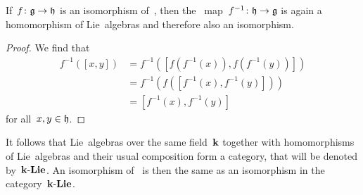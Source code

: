 \begin{lemma}
 If~$f \colon \mathfrak{g} \to \mathfrak{h}$ is an isomorphism of~{\liealgebras{$\kf$}}, then the~{\linear{$\kf$}} map~$f^{-1} \colon \mathfrak{h} \to \mathfrak{g}$ is again a homomorphism of Lie~algebras and therefore also an isomorphism.
\end{lemma}


\begin{proof}
 We find that
 \begin{align*}
  f^{-1}( [x,y] )
  &=
  f^{-1}( [ f(f^{-1}(x)), f(f^{-1}(y)) ] ) \\
  &=
  f^{-1}(f( [f^{-1}(x), f^{-1}(y)] )) \\
  &=
  [f^{-1}(x), f^{-1}(y)]
 \end{align*}
 for all~$x, y \in \mathfrak{h}$.
\end{proof}


\begin{remark}
 It follows that Lie~algebras over the same field~$\kf$ together with homomorphisms of Lie~algebras and their usual composition form a category, that will be denoted by~$\mathbf{k}\text{-}\mathbf{Lie}$.
 An isomorphism of~{\liealgebras{$\kf$}} is then the same as an isomorphism in the category~$\mathbf{k}\text{-}\mathbf{Lie}$.
\end{remark}



